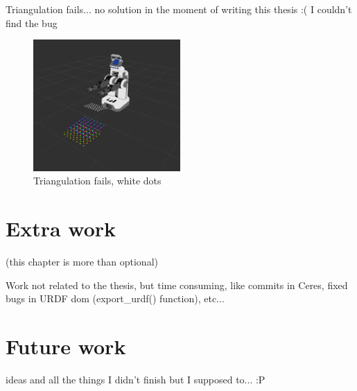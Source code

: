 Triangulation fails... no solution in the moment of writing this thesis :( I couldn't find the bug
\begin{figure}[!htbp]
 \centering
 \includegraphics[width=0.5\textwidth]{images/screenshots/triangulation_fails.png}
 \caption{Triangulation fails, white dots}
 \label{fig:triangulation_fails}
\end{figure}




\chapter{Extra work}
\label{cha:extra}

(this chapter is more than optional)

Work not related to the thesis, but time consuming, like commits in Ceres, fixed bugs in URDF dom (export\_urdf() function), etc...



\chapter{Future work}
\label{cha:future}

ideas and all the things I didn't finish but I supposed to... :P
